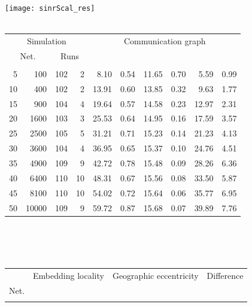 \documentclass{article}
\begin{document}
\begin{figure}[h]
\begin{center}
\texttt{[image: sinrScal\_res]}
~\\~\\
\begin{tabular}{|rr|rr|rr|rr|rr|}
\hline
\multicolumn{4}{|c|}{Simulation} & \multicolumn{6}{|c|}{Communication graph}\\
\multicolumn{2}{|c}{Net.} & \multicolumn{2}{c|}{Runs} & \multicolumn{2}{|c}{} & \multicolumn{2}{c}{} & \multicolumn{2}{c|}{}\\
\hline
\multicolumn{1}{|c}{} & \multicolumn{1}{c|}{} & \multicolumn{1}{|c}{} & \multicolumn{1}{c|}{} & \multicolumn{1}{|c}{} & \multicolumn{1}{c|}{} & \multicolumn{1}{|c}{} & \multicolumn{1}{c|}{} & \multicolumn{1}{|c}{} & \multicolumn{1}{c|}{}\\
5  &   100 & 102 &  2 &  8.10 & 0.54 & 11.65 & 0.70 &  5.59 & 0.99\\
10 &   400 & 102 &  2 & 13.91 & 0.60 & 13.85 & 0.32 &  9.63 & 1.77\\
15 &   900 & 104 &  4 & 19.64 & 0.57 & 14.58 & 0.23 & 12.97 & 2.31\\
20 &  1600 & 103 &  3 & 25.53 & 0.64 & 14.95 & 0.16 & 17.59 & 3.57\\
25 &  2500 & 105 &  5 & 31.21 & 0.71 & 15.23 & 0.14 & 21.23 & 4.13\\
30 &  3600 & 104 &  4 & 36.95 & 0.65 & 15.37 & 0.10 & 24.76 & 4.51\\
35 &  4900 & 109 &  9 & 42.72 & 0.78 & 15.48 & 0.09 & 28.26 & 6.36\\
40 &  6400 & 110 & 10 & 48.31 & 0.67 & 15.56 & 0.08 & 33.50 & 5.87\\
45 &  8100 & 110 & 10 & 54.02 & 0.72 & 15.64 & 0.06 & 35.77 & 6.95\\
50 & 10000 & 109 &  9 & 59.72 & 0.87 & 15.68 & 0.07 & 39.89 & 7.76\\
\hline
\end{tabular}\\
~\\~\\
\begin{tabular}{|r|rr|rr|rr|rr|rr|}
\hline
& \multicolumn{4}{|c|}{Embedding locality} & \multicolumn{4}{|c|}{Geographic eccentricity} & \multicolumn{2}{|c|}{Difference}\\
Net. & \multicolumn{2}{c}{} & \multicolumn{2}{c|}{} & \multicolumn{2}{c}{} & \multicolumn{2}{c|}{}&  & \\
\hline
\multicolumn{1}{|c|}{} & \multicolumn{1}{|c}{} & \multicolumn{1}{c|}{} & \multicolumn{1}{|c}{} & \multicolumn{1}{c|}{} & \multicolumn{1}{|c}{} & \multicolumn{1}{c|}{} & \multicolumn{1}{|c}{} & \multicolumn{1}{c|}{} & \multicolumn{1}{|c}{} & \multicolumn{1}{c|}{}\\

\end{tabular}
\end{center}
\end{figure}
\end{document}
